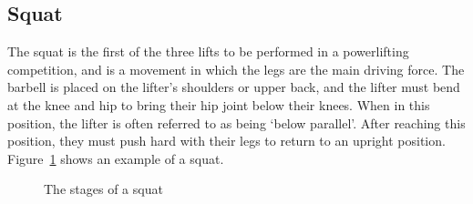 \subsection{Squat}

The squat is the first of the three lifts to be performed in a powerlifting competition, and is a movement in which the legs are the main driving force. The barbell is placed on the lifter's shoulders or upper back, and the lifter must bend at the knee and hip to bring their hip joint below their knees. When in this position, the lifter is often referred to as being `below parallel'. After reaching this position, they must push hard with their legs to return to an upright position. Figure~\ref{fig:squat_stages} shows an example of a squat.

\begin{figure}[H]
    \centering
\caption{The stages of a squat}
\label{fig:squat_stages}
\end{figure}

